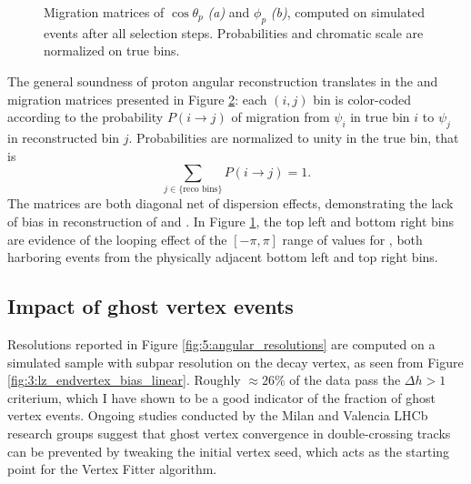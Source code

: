 \begin{figure}[t]
\begin{subfigure}{.45\textwidth}
		\caption{}
		\label{fig:5:MCRECO_p_phi_migration}
	\end{subfigure}
	\caption{Migration matrices of $\cos\theta_p$ \textit{(a)} and $\phi_p$ \textit{(b)}, computed on simulated \demonstratorshort events after all selection steps. Probabilities and chromatic scale are normalized on true bins.}
	\label{fig:5:angular_migration_matrices}
\end{figure}

The general soundness of proton angular reconstruction translates in the \cthetap and \phip migration matrices presented in Figure \ref{fig:5:angular_migration_matrices}:
each $(i,j)$ bin is color-coded according to the probability $P(i \rightarrow j)$ of migration from $\psi_i$ in true bin $i$ to $\psi_j$ in reconstructed bin $j$. Probabilities are normalized to unity in the true bin, that is
\begin{equation}
	\sum_{j \in \{ \text{reco bins} \}} P(i\rightarrow j) = 1.
\end{equation}
The matrices are both diagonal net of dispersion effects, demonstrating the lack of bias in reconstruction of \cthetap and \phip.
In Figure \ref{fig:5:MCRECO_p_phi_migration}, the top left and bottom right bins are evidence of the looping effect of the $[-\pi,\pi]$ range of values for \phip, both harboring events from the physically adjacent bottom left and top right bins.

\subsection{Impact of ghost vertex events}
\label{sec:5:resolution_after_ghost}

Resolutions reported in Figure \ref{fig:5:angular_resolutions} are computed on a simulated sample with subpar resolution on the \lz decay vertex, as seen from Figure \ref{fig:3:lz_endvertex_bias_linear}.
Roughly $\approx 26\%$ of the data pass the $\Delta h > 1$ criterium, which I have shown to be a good indicator of the fraction of ghost vertex events.
Ongoing studies conducted by the Milan and Valencia LHCb research groups suggest that ghost vertex convergence in double-crossing tracks can be prevented by tweaking the initial vertex seed, which acts as the starting point for the Vertex Fitter algorithm.


